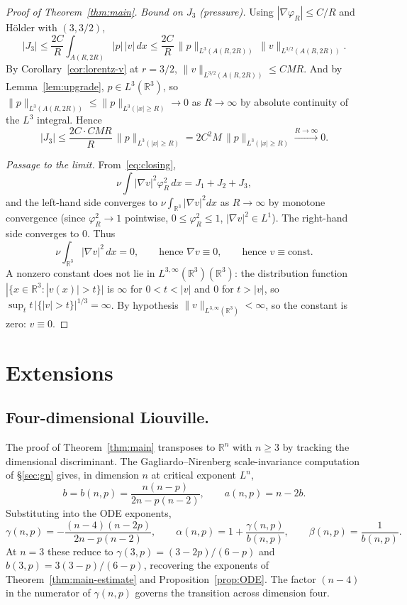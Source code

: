 \documentclass[11pt]{amsart}
\theoremstyle{definition}
\newcommand{\RR}{\mathbb{R}}
\newcommand{\Lweak}[1]{L^{3,\infty}(\RR^{#1})}
\newcommand{\norm}[1]{\|#1\|}
\newcommand{\abs}[1]{|#1|}
\begin{document}
\begin{proof}[Proof of Theorem~\ref{thm:main}]
\emph{Bound on $J_3$ (pressure).} Using $\abs{\nabla\varphi_R}
\leq C/R$ and H\"older with $(3, 3/2)$,
\[
\abs{J_3} \leq \frac{2C}{R}\int_{A(R, 2R)} \abs{p}\,\abs{v}\,dx
\leq \frac{2C}{R}\,\norm{p}_{L^3(A(R, 2R))}\,\norm{v}_{L^{3/2}(A(R, 2R))}.
\]
By Corollary~\ref{cor:lorentz-v} at $r = 3/2$,
$\norm{v}_{L^{3/2}(A(R, 2R))} \leq CMR$. And by
Lemma~\ref{lem:upgrade}, $p \in L^3(\RR^3)$, so
$\norm{p}_{L^3(A(R, 2R))} \leq \norm{p}_{L^3(\abs{x}\geq R)}
\to 0$ as $R \to \infty$ by absolute continuity of the $L^3$
integral. Hence
\[
\abs{J_3} \leq \frac{2C \cdot CMR}{R}\,\norm{p}_{L^3(\abs{x}\geq R)}
= 2C^2M\,\norm{p}_{L^3(\abs{x}\geq R)} \xrightarrow{R\to\infty} 0.
\]

\emph{Passage to the limit.} From~\eqref{eq:closing},
\[
\nu \int \abs{\nabla v}^2 \varphi_R^2\,dx = J_1 + J_2 + J_3,
\]
and the left-hand side converges to $\nu \int_{\RR^3}
\abs{\nabla v}^2 dx$ as $R \to \infty$ by monotone convergence
(since $\varphi_R^2 \to 1$ pointwise, $0 \leq \varphi_R^2 \leq
1$, $\abs{\nabla v}^2 \in L^1$). The right-hand side converges to
$0$. Thus
\[
\nu \int_{\RR^3} \abs{\nabla v}^2\, dx = 0,
\qquad \text{hence } \nabla v \equiv 0,
\qquad \text{hence } v \equiv \text{const.}
\]
A nonzero constant does not lie in $\Lweak{3}(\RR^3)$: the
distribution function $\abs{\{x \in \RR^3 : \abs{v(x)} > t\}}$
is $\infty$ for $0 < t < \abs{v}$ and $0$ for $t > \abs{v}$, so
$\sup_t t\,\abs{\{\abs{v}>t\}}^{1/3} = \infty$. By hypothesis
$\norm{v}_{\Lweak{3}} < \infty$, so the constant is zero: $v
\equiv 0$. \qedhere
\end{proof}

\section{Extensions}\label{sec:extensions}

\subsection{Four-dimensional Liouville.}
\label{ssec:4d}

The proof of Theorem~\ref{thm:main} transposes to $\RR^n$ with
$n \geq 3$ by tracking the dimensional discriminant. The
Gagliardo--Nirenberg scale-invariance computation of
\S\ref{sec:gn} gives, in dimension $n$ at critical exponent
$L^n$,
\[
b = b(n, p) = \frac{n(n - p)}{2n - p(n - 2)},
\qquad a(n, p) = n - 2b.
\]
Substituting into the ODE exponents,
\[
\gamma(n, p) = -\frac{(n - 4)(n - 2p)}{2n - p(n - 2)},
\qquad
\alpha(n, p) = 1 + \frac{\gamma(n,p)}{b(n,p)},
\qquad
\beta(n, p) = \frac{1}{b(n, p)}.
\]
At $n = 3$ these reduce to $\gamma(3,p) = (3-2p)/(6-p)$ and
$b(3,p) = 3(3-p)/(6-p)$, recovering the exponents of
Theorem~\ref{thm:main-estimate} and Proposition~\ref{prop:ODE}.
The factor $(n - 4)$ in the numerator of $\gamma(n,p)$ governs
the transition across dimension four.
\end{document}
